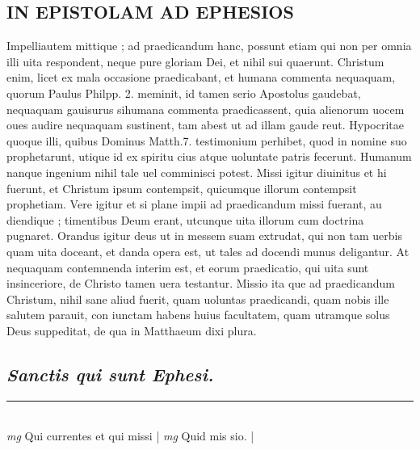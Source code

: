 \documentclass{article}
\begin{document}
\begin{pages}
\section*{IN EPISTOLAM AD EPHESIOS }\pstart Impelliautem mittique ; ad praedicandum hanc, possunt etiam qui non per omnia illi uita respondent, neque pure gloriam Dei, et nihil sui quaerunt. Christum enim, licet ex mala occasione praedicabant, et humana commenta nequaquam, quorum Paulus Philpp. 2. meminit, id tamen serio Apostolus gaudebat, nequaquam gauisurus sihumana commenta praedicassent, quia alienorum uocem oues audire nequaquam sustinent, tam abest ut ad illam gaude reut. Hypocritae quoque illi, quibus Dominus Matth.7. testimonium perhibet, quod in nomine suo prophetarunt, utique  id ex spiritu cius atque  uoluntate patris fecerunt. Humanum nanque ingenium nihil tale uel comminisci potest.  Missi igitur diuinitus et hi fuerunt, et Christum ipsum contempsit, quicumque  illorum contempsit prophetiam.  Vere igitur et si plane impii ad praedicandum missi fuerant, au diendique ; timentibus Deum erant, utcunque uita illorum cum doctrina pugnaret.   \pend\pstart Orandus igitur deus ut in messem suam extrudat, qui non tam uerbis quam uita doceant, et danda opera est, ut tales ad docendi munus deligantur. At nequaquam contemnenda interim est, et eorum praedicatio, qui uita sunt insinceriore, de Christo tamen uera testantur.  Missio ita que ad praedicandum Christum, nihil sane aliud fuerit, quam uoluntas praedicandi, quam nobis ille salutem parauit, con iunctam habens huius facultatem, quam utramque solus Deus suppeditat, de qua in Matthaeum dixi plura.   \pend
{}
{}
\subsection*{\textit{Sanctis qui sunt Ephesi. }}
\vspace{0.5cm}\noindent
\vspace{0.2cm}\rule{1cm}{0.2pt}\\ 
\hspace{0.2cm}\textit{mg}
\footnotesize Qui currentes et qui missi
\normalsize| 
\hspace{0.2cm}\textit{mg}
\footnotesize Quid mis sio.  
\normalsize| 

\end{pages}
\end{document}
